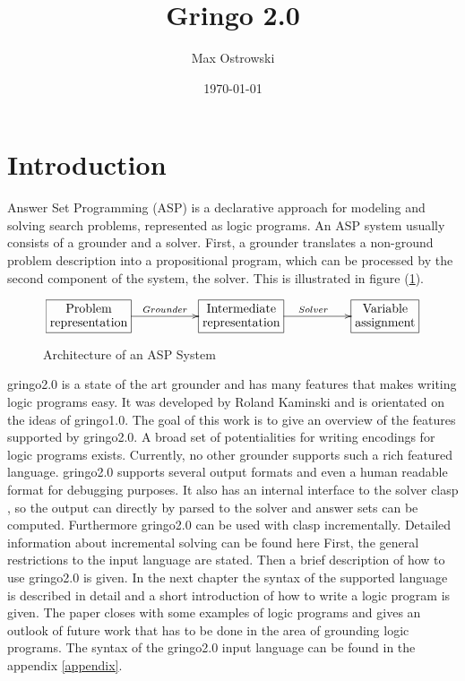 \documentclass[a4paper,10pt]{article}
\author{Max Ostrowski}
\title{Gringo 2.0}
\date{\today}
\begin{document}
\maketitle
\tableofcontents
\section{Introduction}
Answer Set Programming (ASP) \cite{baral02a} is a declarative approach for modeling and solving search problems, represented as logic programs.
An ASP system usually consists of a grounder and a solver.
First, a grounder translates a non-ground problem description into a propositional program, which can be processed by the second component of the system, the solver. This is illustrated in figure (\ref{fig:ASP}).
\begin{figure}[h]
\[
\xymatrix{*+[F]\txt{Problem\\representation}\ar[rr]^{Grounder}&&
		*+[F]\txt{Intermediate\\ representation} \ar[rr]^{Solver}&&
		*+[F]\txt{Variable\\ assignment}}
\]
\caption{Architecture of an ASP System}
\label{fig:ASP}
\end{figure}
gringo2.0 is a state of the art grounder and has many features that makes writing logic programs easy.
It was developed by Roland Kaminski and is orientated on the ideas of gringo1.0.
The goal of this work is to give an overview of the features supported by gringo2.0. A broad set of potentialities for writing encodings for logic programs exists. Currently, no other grounder supports such a rich featured language.
gringo2.0 supports several output formats and even a human readable format for debugging purposes.
It also has an internal interface to the solver clasp \cite{gekanesc07b}, so the output can directly by parsed to the solver and answer sets can be computed.
Furthermore gringo2.0 can be used with clasp incrementally. Detailed information about incremental solving can be found here \cite{IncrementalASP} 
First, the general restrictions to the input language are stated. Then a brief description of how to use gringo2.0 is given.
In the next chapter the syntax of the supported language is described in detail and a short introduction of how to write a logic program is given. The paper closes with some examples of logic programs and gives an outlook of future work that has to be done in the area of grounding logic programs.
The syntax of the gringo2.0 input language can be found in the appendix \ref{appendix}.
\end{document}
